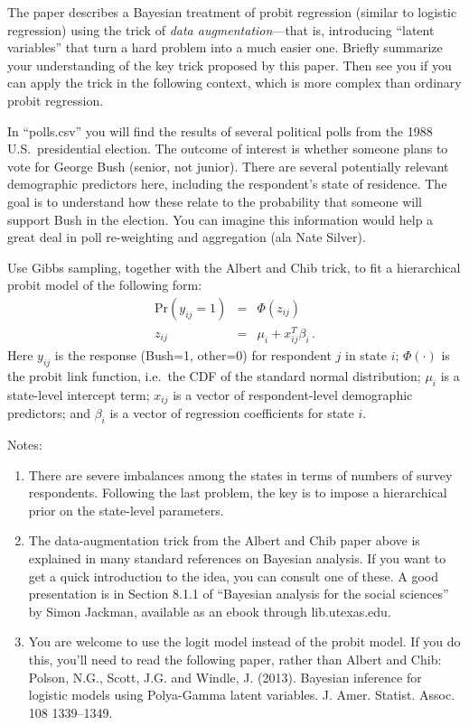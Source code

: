 \documentclass{article}
\begin{document}
The paper describes a Bayesian treatment of probit regression (similar to logistic regression) using the trick of \textit{data augmentation}---that is, introducing ``latent variables'' that turn a hard problem into a much easier one.  Briefly summarize your understanding of the key trick proposed by this paper.  Then see you if you can apply the trick in the following context, which is more complex than ordinary probit regression.

In ``polls.csv'' you will find the results of several political polls from the 1988 U.S.~presidential election.  The outcome of interest is whether someone plans to vote for George Bush (senior, not junior).  There are several potentially relevant demographic predictors here, including the respondent's state of residence.  The goal is to understand how these relate to the probability that someone will support Bush in the election.  You can imagine this information would help a great deal in poll re-weighting and aggregation (ala Nate Silver).

Use Gibbs sampling, together with the Albert and Chib trick, to fit a hierarchical probit model of the following form:
\begin{eqnarray*}
\mbox{Pr}(y_{ij} = 1) &=& \Phi(z_{ij})  \\
z_{ij} &=& \mu_i + x_{ij}^T \beta_i \, .
\end{eqnarray*}
Here $y_{ij}$ is the response (Bush=1, other=0) for respondent $j$ in state $i$; $\Phi(\cdot)$ is the probit link function, i.e.~the CDF of the standard normal distribution; $\mu_i$ is a state-level intercept term; $x_{ij}$ is a vector of respondent-level demographic predictors; and $\beta_i$ is a vector of regression coefficients for state $i$.

Notes:
\begin{enumerate}
\item There are severe imbalances among the states in terms of numbers of survey respondents. Following the last problem, the key is to impose a hierarchical prior on the state-level parameters.
\item The data-augmentation trick from the Albert and Chib paper above is explained in many standard references on Bayesian analysis.  If you want to get a quick introduction to the idea, you can consult one of these.  A good presentation is in Section 8.1.1 of ``Bayesian analysis for the social sciences'' by Simon Jackman, available as an ebook through lib.utexas.edu.
\item You are welcome to use the logit model instead of the probit model.  If you do this, you'll need to read the following paper, rather than Albert and Chib: Polson, N.G., Scott, J.G. and Windle, J. (2013). Bayesian inference for logistic models using Polya-Gamma latent variables. J. Amer. Statist. Assoc. 108 1339--1349.  
\end{enumerate}
\end{document}
